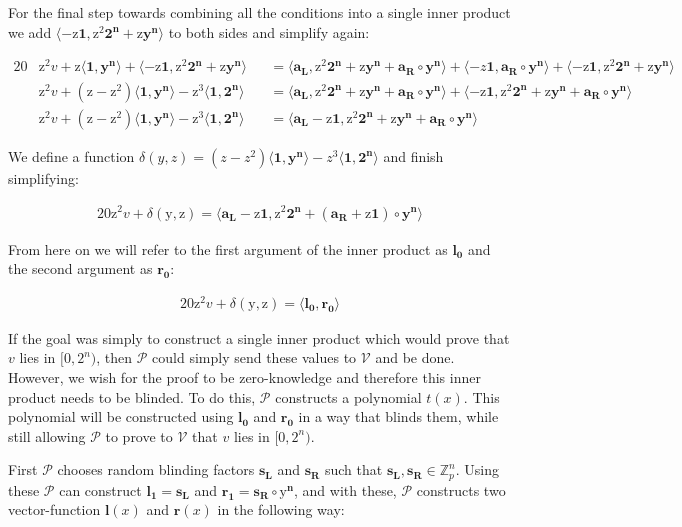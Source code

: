 \documentclass{article}
\newcommand{\eq}[1]{\begin{alignat*}{20}#1\end{alignat*}}
\renewcommand{\vec}[1]{\boldsymbol{#1}}
\newcommand{\ran}[1]{\mathrm{#1}}
\newcommand{\vecran}[1]{\mathbf{#1}}
\newcommand{\V}{\mathcal{V}}
\renewcommand{\P}{\mathcal{P}}
\newcommand{\Z}{\mathbb{Z}}
\newcommand{\dotp}[2]{\langle #1, #2 \rangle}
\newcommand{\opn}[1]{\operatorname{#1}}
\newcommand{\vecl}[1]{\vec{#1_{\opn{L}}}}
\newcommand{\vecr}[1]{\vec{#1_{\opn{R}}}}
\begin{document}
For the final step towards combining all the conditions into a single
inner product we add $\dotp{-\ran{z}\vec{1}}{\ran{z^2}\vec{2^n} +
\ran{z}\vecran{y}^{\vec{n}}}$ to both sides and simplify again:

\eq{
	&\ran{z^2}v + \ran{z}\dotp{\vec{1}}{\vecran{y}^{\vec{n}}} + \dotp{-\ran{z}\vec{1}}{\ran{z^2}\vec{2^n} + \ran{z}\vecran{y}^{\vec{n}}}
	&&= \dotp{\vecl{a}}{\ran{z^2}\vec{2^n} + \ran{z}\vecran{y}^{\vec{n}} + \vecr{a}\circ \vecran{y}^{\vec{n}}} +
	\dotp{-z\vec{1}}{\vecr{a}\circ\vecran{y}^{\vec{n}}} + \dotp{-\ran{z}\vec{1}}{\ran{z^2}\vec{2^n} + \ran{z}\vecran{y}^{\vec{n}}} \\ 
	&\ran{z^2}v + (\ran{z} - \ran{z^2})\dotp{\vec{1}}{\vecran{y}^{\vec{n}}} - \ran{z^3}\dotp{\vec{1}}{\vec{2^n}} &&= \dotp{\vecl{a}}{\ran{z^2}\vec{2^n} + \ran{z}\vecran{y}^{\vec{n}} + \vecr{a}\circ \vecran{y}^{\vec{n}}} + \dotp{-\ran{z}\vec{1}}{\ran{z^2}\vec{2^n}+\ran{z}\vecran{y}^{\vec{n}} + \vecr{a}\circ\vecran{y}^{\vec{n}}}
	\\
	&\ran{z^2}v + (\ran{z} - \ran{z^2})\dotp{\vec{1}}{\vecran{y}^{\vec{n}}} - \ran{z^3}\dotp{\vec{1}}{\vec{2^n}} &&= \dotp{\vecl{a}- \ran{z}\vec{1}}{\ran{z^2}\vec{2^n} + \ran{z}\vecran{y}^{\vec{n}} + \vecr{a}\circ \vecran{y}^{\vec{n}}}
}

We define a function $\delta(y,z) = (z - z^2)\dotp{\vec{1}}{\vec{y^n}}
- z^3\dotp{\vec{1}}{\vec{2^n}}$ and finish simplifying:

\eq{
	\ran{z^2}v + \delta(\ran{y},\ran{z}) = \dotp{\vecl{a} - \ran{z}\vec{1}}{\ran{z^2}\vec{2^n} + (\vecr{a} + \ran{z}\vec{1})\circ\vecran{y}^{\vec{n}}}
}

From here on we will refer to the first argument of the inner product
as $\vec{l_0}$ and the second argument as $\vec{r_0}$:

\eq{
	\ran{z^2}v + \delta(\ran{y},\ran{z}) = \dotp{\vec{l_0}}{\vec{r_0}}
}

If the goal was simply to construct a single inner product which
would prove that $v$ lies in $[0,2^n)$, then $\P$ could simply send
these values to $\V$ and be done. However, we wish for the proof to be
zero-knowledge and therefore this inner product needs to be blinded. To
do this, $\P$ constructs a polynomial $t(x)$. This polynomial will
be constructed using $\vec{l_0}$ and $\vec{r_0}$ in a way that blinds
them, while still allowing $\P$ to prove to $\V$ that $v$ lies in
$[0,2^n)$.

First $\P$ chooses random blinding factors $\vecran{s_L}$ and
$\vecran{s_R}$ such that $\vecl{s},\vecr{s}\in \Z^n_p$. Using these
$\P$ can construct $\vec{l_1} = \vecl{s}$ and $\vec{r_1} = \vecr{s}\circ \vec{\ran{y}^n}$, 
and with these, $\P$ constructs two vector-function $\vec{l}(x)$ and $\vec{r}(x)$
in the following way:
\end{document}
